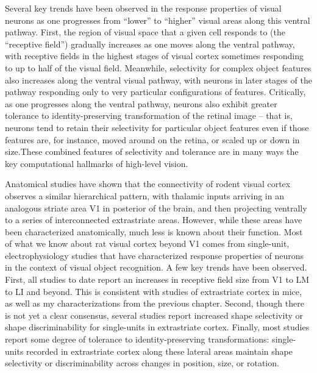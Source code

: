 Several key trends have been observed in the response properties of visual neurons as one progresses from ``lower'' to ``higher'' visual areas along this ventral pathway. First, the region of visual space that a given cell responds to (the ``receptive field'') gradually increases as one moves along the ventral pathway, with receptive fields in the highest stages of visual cortex sometimes responding to up to half of the visual field\cite{OpDeBeeck2001}. Meanwhile, selectivity for complex object features also increases along the ventral visual pathway, with neurons in later stages of the pathway responding only to very particular configurations of features\cite{Desimone1984, Logothetis1996}. Critically, as one progresses along the ventral pathway, neurons also exhibit greater tolerance to identity-preserving transformation of the retinal image -- that is, neurons tend to retain their selectivity for particular object features even if those features are, for instance, moved around on the retina, or scaled up or down in size\cite{Ito1995}.These combined features of selectivity and tolerance are in many ways the key computational hallmarks of high-level vision\cite{DiCarlo2007, DiCarlo2012}. 

Anatomical studies have shown that the connectivity of rodent visual cortex observes a similar hierarchical pattern, with thalamic inputs arriving in an analogous striate area V1 in posterior of the brain, and then projecting ventrally to a series of interconnected extrastriate areas\cite{Coogan1993}. However, while these areas have been characterized anatomically, much less is known about their function. Most of what we know about rat visual cortex beyond V1 comes from single-unit, electrophysiology studies that have characterized response properties of neurons in the context of visual object recognition\cite{Tafazoli2017, Vermaercke2014, Vinken2014}. A few key trends have been observed. First, all studies to date report an increases in receptive field size from V1 to LM to LI and beyond\cite{Tafazoli2017}. This is consistent with studies of extrastriate cortex in mice\cite{Murgas2020, Siegle2021}, as well as my characterizations from the previous chapter. Second, though there is not yet a clear consensus, several studies report increased shape selectivity or shape discriminability for single-units in extrastriate cortex\cite{Tafazoli2017, Vermaercke2014, Vermaercke2015, Vinken2016}. Finally, most studies report some degree of tolerance to identity-preserving transformations: single-units recorded in extrastriate cortex along these lateral areas maintain shape selectivity or discriminability across changes in position, size, or rotation\cite{Vermaercke2014, Tafazoli2017}.

